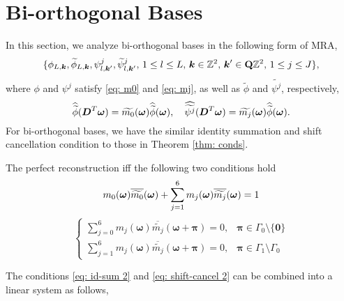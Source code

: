 \section{Bi-orthogonal Bases}\label{sec: bi-orth}
In this section, we analyze bi-orthogonal bases in the following form of MRA,
\begin{align}\label{eq: bi-orth MRA}
\{\phi_{L,\boldsymbol{k}},\widetilde{\phi}_{L,\boldsymbol{k}}, \psi_{l,\boldsymbol{k}'}^j,\widetilde{\psi}_{l,\boldsymbol{k}'}^j,\, 1\leq l\leq L,\,\boldsymbol{k}\in\mathbb{Z}^2,\, \boldsymbol{k}'\in\mathbf{Q}\mathbb{Z}^2,\,1\leq j\leq J \},
\end{align}
where $\phi$ and $\psi^j$ satisfy \eqref{eq: m0} and \eqref{eq: mj}, as well as $\widetilde{\phi}$ and $\widetilde{\psi^j}$, respectively,
$$\widehat{\widetilde{\phi}}(\boldsymbol{D}^T\boldsymbol{\omega}) = \widetilde{m_0}(\boldsymbol{\omega})\widehat{\widetilde{\phi}}(\boldsymbol{\omega}),\quad \widehat{\widetilde{\psi^j}}(\boldsymbol{D}^T\boldsymbol{\omega}) = \widetilde{m_j}(\boldsymbol{\omega})\widehat{\widetilde{\phi}}(\boldsymbol{\omega}).$$
For bi-orthogonal bases, we have the similar identity summation and shift cancellation condition to those in Theorem \ref{thm: conds}.
\begin{thm}\label{thm: bi-orth conds}
The perfect reconstruction iff the following two conditions hold
\begin{align}\label{eq: id-sum 2}
m_0(\boldsymbol{\omega})\overline{\widetilde{m_{0}}}(\boldsymbol{\omega}) + \sum_{j = 1}^6 m_j(\boldsymbol{\omega})\overline{\widetilde{m_{j}}}(\boldsymbol{\omega}) = 1
\end{align}
\begin{equation}\label{eq: shift-cancel 2}
\begin{cases}
\sum_{j = 0}^6m_j(\boldsymbol{\omega})\overline{\widetilde{m_j}}(\boldsymbol{\omega} + \boldsymbol{\pi}) = 0, & \boldsymbol{\pi}\in \Gamma_0\setminus\{\boldsymbol{0}\}\\[.5em]
\sum_{j=1}^6m_j(\boldsymbol{\omega})\overline{\widetilde{m_j}}(\boldsymbol{\omega}+\boldsymbol{\pi}) = 0, & \boldsymbol{\pi}\in\Gamma_1\setminus\Gamma_0
\end{cases}
\end{equation}
\end{thm}
The conditions \eqref{eq: id-sum 2} and \eqref{eq: shift-cancel 2} can be combined into a linear system as follows,
